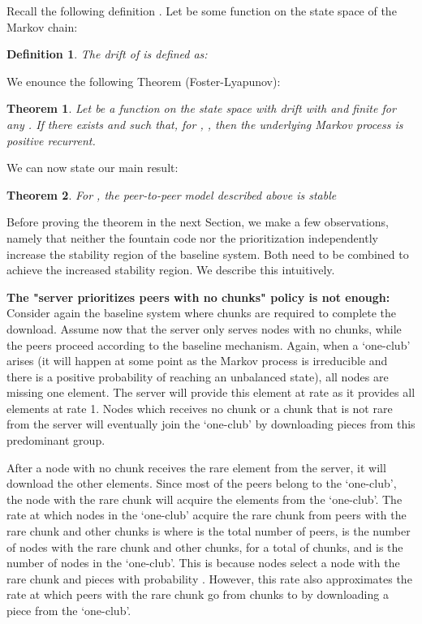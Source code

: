 \documentclass[11pt,conference]{IEEEtran}
\newtheorem{theorem}{Theorem}[section]
\newcommand{\bTheorem}{ \begin{theorem}  }
\newcommand{\eTheorem}{ \end{theorem}    }
\newtheorem{Definition}{Definition}[section]
\newcommand{\bDef}{ \begin{Definition} }
\newcommand{\eDef}{ \end{Definition} }
\begin{document}
Recall the following definition
\cite{Foss2008Lyapunov}. Let  be some function on the state space  of the Markov chain:
\bDef
The drift  of  is defined as:

\eDef

We enounce the following Theorem (Foster-Lyapunov)\cite{Foss2008Lyapunov}:
\bTheorem
\label{theo:drift}
Let  be a function on the state space with drift  with  and  finite for any . If there exists  and  such that, for , , then the underlying Markov process is positive recurrent.
\eTheorem

We can now state our main result:
\bTheorem
\label{theo:stable}
For , the peer-to-peer model described above is stable
\eTheorem

Before proving the theorem in the next Section, we make a few observations, namely that neither the fountain code nor the prioritization independently increase the stability region of the baseline system. Both need to be combined to achieve the increased stability region. We describe this intuitively.

{\bf The "server prioritizes peers with no chunks" policy is not enough:} Consider again the baseline system where  chunks are required to complete the download. Assume now that the server only serves nodes with no chunks, while the peers proceed according to the baseline mechanism. Again, when a `one-club' arises (it will happen at some point as the Markov process is irreducible and there is a positive probability of reaching an unbalanced state), all  nodes are missing one element. The server will provide this element at rate  as it provides all  elements at rate 1. Nodes which receives no chunk or a chunk that is not rare from the server will eventually join the `one-club' by downloading pieces from this predominant group.

 After a node with no chunk receives the rare element from the server, it will download the other elements. Since most of the peers belong to the `one-club', the node with the rare chunk will acquire the  elements from the `one-club'. The rate at which nodes in the `one-club' acquire the rare chunk from peers with the rare chunk and  other chunks is  where  is the total number of peers,  is the number of nodes with the rare chunk and  other chunks, for a total of  chunks, and  is the number of nodes in the `one-club'. This is because  nodes select a node with the rare chunk and  pieces with probability . However, this rate also approximates the rate at which peers with the rare chunk go from  chunks to  by downloading a piece from the `one-club'.
\end{document}
